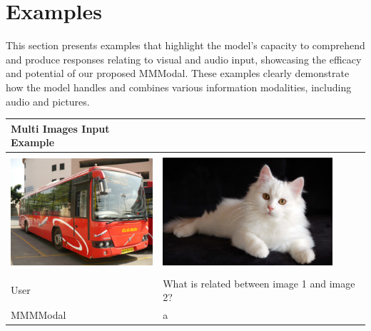 \documentclass[preprint]{article}
\begin{document}
\section{Examples}

This section presents examples that highlight the model's capacity to comprehend and produce responses relating to visual and audio input, showcasing the efficacy and potential of our proposed MMModal. These examples clearly demonstrate how the model handles and combines various information modalities, including audio and pictures.

\begin{table}[hbt]
  \centering
  \setlength{\extrarowheight}{3pt} %
  \renewcommand{\arraystretch}{1.5} %
  \begin{tabular}{p{6.5cm}p{6.5cm}}
    \hline
    \textbf{Multi Images Input Example}                                                                                            \\[6pt]
    \hline
    \hline
    \\[-1pt]
    \includegraphics[width=0.9\linewidth,height=4cm]{pic/bus.jpeg} & \includegraphics[width=0.9\linewidth,height=4cm]{pic/cat.jpg} \\
    \\[-1pt]
    \hline
    User                                                           & What is related between image 1 and image 2?                  \\
    MMMModal                                                       & a                                                             \\
    \hline
  \end{tabular}
\end{table}
\end{document}
